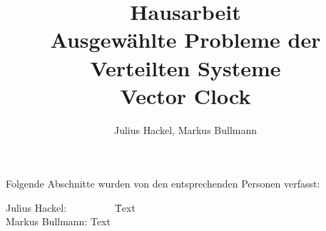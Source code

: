\documentclass[a4paper]{article}
\author{Julius Hackel, Markus Bullmann}
\title{Hausarbeit \\ Ausgewählte Probleme der Verteilten Systeme \\ Vector Clock}
\begin{document}
\maketitle
\tableofcontents
\newpage

Folgende Abschnitte wurden von den entsprechenden Personen verfasst:
\begin{tabbing}
Julius Hackel:~~~~~~~~~ \= Text \\
Markus Bullmann:        \> Text \\

\end{tabbing}

\newpage


\cleardoublepage

\cleardoublepage

\cleardoublepage

\cleardoublepage

\cleardoublepage



\newpage

\end{document}
